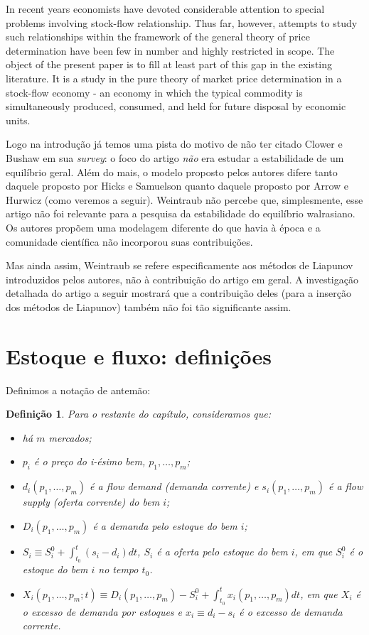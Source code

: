 \documentclass[
	12pt,				%
	openright,			%
	twoside,			%
	a4paper,			%
	english,			%
	french,				%
	spanish,			%
	brazil				%
	]{abntex2}
\newtheorem{definicao}{Definição}[chapter]
\newcommand{\precos}{p_1, \ldots, p_m}
\begin{document}
\begin{citacao}[english]
	In recent years economists have devoted considerable attention to special
problems involving stock-flow relationship. Thus far, however, attempts to
study such relationships within the framework of the general theory of price
determination have been few in number and highly restricted in scope. The
object of the present paper is to fill at least part of this gap in the existing literature.
It is a study in the pure theory of market price determination in a stock-flow economy - an
economy in which the typical commodity is simultaneously produced, consumed, and
held for future disposal by economic units. \cite[p. 328]{bushawclower1954}
\end{citacao}

Logo na introdução já temos uma pista do motivo de 
não ter citado Clower e Bushaw em sua \textit{survey}: o foco do artigo \textit{não}
era estudar a estabilidade de um equilíbrio geral. Além do mais, o modelo proposto pelos autores
difere tanto daquele proposto por Hicks e Samuelson quanto daquele proposto por
Arrow e Hurwicz (como veremos a seguir). Weintraub não percebe que, simplesmente,
esse artigo não foi relevante para a pesquisa da estabilidade do equilíbrio walrasiano.
Os autores propõem uma modelagem diferente do que havia à época
e a comunidade científica não incorporou suas contribuições.

Mas ainda assim, Weintraub se refere especificamente aos métodos de Liapunov
introduzidos pelos autores, não à contribuição do artigo em geral.
A investigação detalhada do artigo a seguir mostrará
que a contribuição deles (para a inserção dos métodos de Liapunov) também não foi tão
significante assim.

\section{Estoque e fluxo: definições}

Definimos a notação de antemão:

\begin{definicao} Para o restante do capítulo, consideramos que:
\begin{itemize}
	\item há $m$ mercados;
	\item $p_i$ é o preço do i-ésimo bem, $\precos$;
	\item $d_i(\precos)$ é a \textit{flow demand} (demanda corrente) e $s_i(\precos)$
	é a \textit{flow supply} (oferta corrente) do bem $i$;
	\item $D_i(\precos)$ é a demanda pelo estoque do bem $i$;
	\item $S_i \equiv S_i^0 + \displaystyle\int^t_{t_0}(s_i - d_i)dt$, $S_i$ é a oferta pelo
	estoque do bem $i$, em que $S_i^0$ é o estoque do bem $i$ no tempo $t_0$.
	\item $X_i(\precos; t) \equiv D_i(\precos) - S_i^0 + \displaystyle \int^t_{t_0}x_i(\precos)dt$, em que
	$X_i$ é o excesso de demanda por estoques e $x_i \equiv d_i - s_i$ é o excesso de demanda corrente.
\end{itemize}
\end{definicao}
\end{document}
